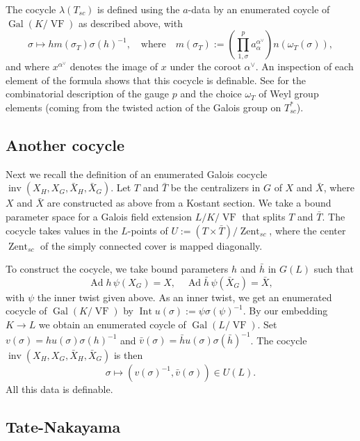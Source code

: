 \documentclass[12pt]{amsart}
\newcommand{\op}[1]{\operatorname{#1}}
\def\VF{{\op{VF}}}
\theoremstyle{plain}
\theoremstyle{definition}
\begin{document}
The cocycle $\lambda(T_{sc})$ is defined using the $a$-data by an enumerated
coycle of $\op{Gal}(K/\VF)$ as described above, with
\[
\sigma \mapsto h m(\sigma_T) \sigma(h)^{-1},\quad \text{where}\quad
m(\sigma_T):= \left( \prod_{1,\sigma}^p a_\alpha^{\alpha^\vee}\right) n(\omega_T(\sigma)),
\]
and where $x^{\alpha^\vee}$ denotes the image of $x$ under the coroot
$\alpha^\vee$.  An inspection of each element of the formula shows
that this cocycle is definable.  See \cite{LSxf} for the combinatorial
description of the gauge $p$ and the choice $\omega_T$ of Weyl group
elements (coming from the twisted action of the Galois group on
$T^*_{sc}$).

\subsection{Another cocycle}

Next we recall the definition of an enumerated Galois cocycle
$\op{inv}(X_H,X_G,\bar X_H,\bar X_G)$.  Let $T$ and $\bar T$ be the
centralizers in $G$ of $X$ and $\bar X$, where $X$ and $\bar X$ are
constructed as above from a Kostant section.  We take a bound
parameter space for a Galois field extension $L/K/\VF$ that splits $T$
and $\bar T$.  The cocycle takes values in the $L$-points of $U:=
(T\times \bar T)/\op{Zent}_{sc}$, where the center $\op{Zent}_{sc}$ of the simply
connected cover is mapped diagonally.

To construct the cocycle, we take bound parameters $h$ and $\bar h$
 in $G(L)$ such that
\[
\op{Ad} h\,\psi(X_G)  = X,\quad \op{Ad} \bar h\, \psi(\bar X_G) = \bar X,
\]
with $\psi$ the inner twist given above.  As an inner twist, we get an
enumerated cocycle of $\op{Gal}(K/\VF)$ by $\op{Int} u(\sigma) := \psi
\sigma(\psi)^{-1}$.  By our embedding $K\to L$ we obtain an enumerated
coycle of $\op{Gal}(L/\VF)$.  Set $v(\sigma) = h u(\sigma)
\sigma(h)^{-1}$ and $\bar v(\sigma) = \bar h u(\sigma) \sigma(\bar
h)^{-1}$. The cocycle $\op{inv}(X_H,X_G,\bar X_H,\bar X_G)$ is then
\[
\sigma \mapsto (v(\sigma)^{-1},\bar v(\sigma))\in U(L).
\]
All this data is definable.

\subsection{Tate-Nakayama}
\end{document}
